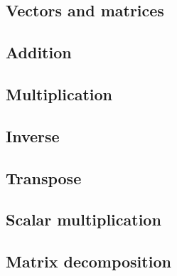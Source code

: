 
\subsection{Vectors and matrices}

\subsection{Addition}

\subsection{Multiplication}

\subsection{Inverse}

\subsection{Transpose}

\subsection{Scalar multiplication}

\subsection{Matrix decomposition}


